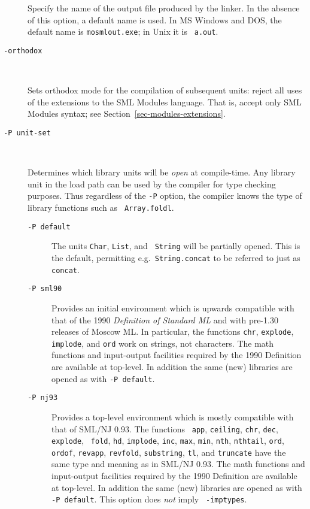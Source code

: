 \documentclass[fleqn,a4paper]{article}
\begin{document}
\begin{description}
  Specify the name of the output file produced by the linker.  In the
  absence of this option, a default name is used.  In MS Windows and
  DOS, the default name is {\tt mosmlout.exe}; in Unix it is {\tt
    a.out}.

\item[{\tt -orthodox}]\mbox{ }
  
  Sets orthodox mode for the compilation of subsequent units: reject
  all uses of the extensions to the SML Modules language.  That is,
  accept only SML Modules syntax; see
  Section~\ref{sec-modules-extensions}.

\item[{\tt -P {\rm unit-set}}]\mbox{ }

  Determines which library units will be {\em open\/} at compile-time.
  Any library unit in the load path can be used by the compiler for
  type checking purposes.  Thus regardless of the {\tt -P} option, the
  compiler knows the type of library functions such as {\tt
    Array.foldl}.

  \begin{description}
  \item[{\tt -P default}] The units {\tt Char}, {\tt List}, and {\tt
      String} will be partially opened.  This is the default,
    permitting e.g.\ {\tt String.concat} to be referred to just as
    {\tt concat}.

  \item[{\tt -P sml90}] Provides an initial environment which is
    upwards compatible with that of the 1990 {\em Definition of
      Standard ML\/} and with pre-1.30 releases of Moscow ML\@.  In
    particular, the functions {\tt chr}, {\tt explode}, {\tt implode},
    and {\tt ord} work on strings, not characters.  The math functions
    and input-output facilities required by the 1990 Definition
    \cite[Appendix C and D]{Milner:1990:TheDefinition} are available
    at top-level.  In addition the same (new) libraries are opened as
    with {\tt -P default}.

  \item[{\tt -P nj93}] Provides a top-level environment which is
    mostly compatible with that of SML/NJ 0.93.  The functions {\tt
      app}, {\tt ceiling}, {\tt chr}, {\tt dec}, {\tt explode}, {\tt
      fold}, {\tt hd}, {\tt implode}, {\tt inc}, {\tt max}, {\tt min},
    {\tt nth}, {\tt nthtail}, {\tt ord}, {\tt ordof}, {\tt revapp},
    {\tt revfold}, {\tt substring}, {\tt tl}, and {\tt truncate} have
    the same type and meaning as in SML/NJ 0.93.  The math functions
    and input-output facilities required by the 1990 Definition
    \cite[Appendix C and D]{Milner:1990:TheDefinition} are available
    at top-level.  In addition the same (new) libraries are opened as
    with {\tt -P default}.  This option does {\em not\/} imply {\tt
      -imptypes}.


\end{description}
\end{description}
\end{document}
